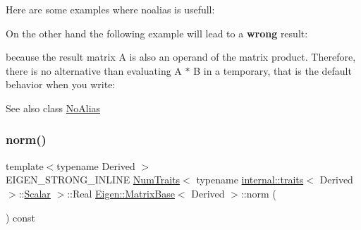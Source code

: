 Here are some examples where noalias is usefull\+: 
\begin{DoxyCode}{0}
\end{DoxyCode}


On the other hand the following example will lead to a {\bfseries{wrong}} result\+: 
\begin{DoxyCode}{0}
\end{DoxyCode}
 because the result matrix A is also an operand of the matrix product. Therefore, there is no alternative than evaluating A $\ast$ B in a temporary, that is the default behavior when you write\+: 
\begin{DoxyCode}{0}
\end{DoxyCode}


\begin{DoxySeeAlso}{See also}
class \mbox{\hyperlink{class_eigen_1_1_no_alias}{No\+Alias}} 
\end{DoxySeeAlso}
\mbox{\label{class_eigen_1_1_matrix_base_a5f6a3bc46add1f2e879ce15040e6987e}} 
\subsubsection{\texorpdfstring{norm()}{norm()}}
{\footnotesize\ttfamily template$<$typename Derived $>$ \\
E\+I\+G\+E\+N\+\_\+\+S\+T\+R\+O\+N\+G\+\_\+\+I\+N\+L\+I\+NE \mbox{\hyperlink{struct_eigen_1_1_num_traits}{Num\+Traits}}$<$ typename \mbox{\hyperlink{struct_eigen_1_1internal_1_1traits}{internal\+::traits}}$<$ Derived $>$\+::\mbox{\hyperlink{class_eigen_1_1_dense_base_a5feed465b3a8e60c47e73ecce83e39a2}{Scalar}} $>$\+::Real \mbox{\hyperlink{class_eigen_1_1_matrix_base}{Eigen\+::\+Matrix\+Base}}$<$ Derived $>$\+::norm (\begin{DoxyParamCaption}{ }\end{DoxyParamCaption}) const}

